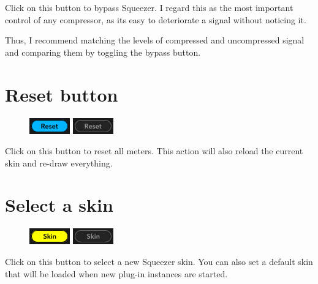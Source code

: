 Click on this button to bypass Squeezer.  I regard this as the most
important control of any compressor, as its easy to deteriorate a
signal without noticing it.

Thus, I recommend matching the levels of compressed and uncompressed
signal and comparing them by toggling the bypass button.

\section{Reset button}

\begin{figure}
  \includegraphics[scale=\screenshotscale,clip]{include/images/button_reset_on.png}
  \newline \vspace{-0.9\baselineskip}
  \includegraphics[scale=\screenshotscale,clip]{include/images/button_reset_off.png}
\end{figure}

Click on this button to reset all meters.  This action will also
reload the current skin and re-draw everything.

\section{Select a skin}

\begin{figure}
  \includegraphics[scale=\screenshotscale,clip]{include/images/button_skin_on.png}
  \newline \vspace{-0.9\baselineskip}
  \includegraphics[scale=\screenshotscale,clip]{include/images/button_skin_off.png}
\end{figure}

Click on this button to select a new Squeezer skin.  You can also set
a default skin that will be loaded when new plug-in instances are
started.

